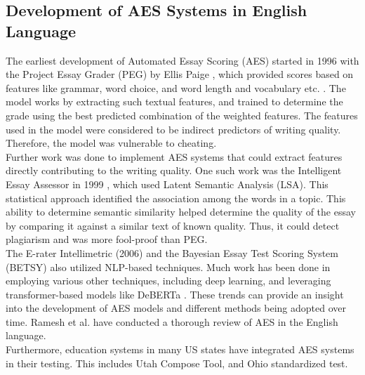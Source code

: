 \documentclass{article}
\begin{document}
\subsection{Development of AES Systems in English Language}
The earliest development of Automated Essay Scoring (AES) started in 1996 with the Project Essay Grader (PEG) by Ellis Paige \cite{page2003peg}, which provided scores based on features like grammar, word choice, and word length and vocabulary etc. . The model works by extracting such textual features, and trained to determine the grade using the best predicted combination of the weighted features. The features used in the model were considered to be indirect predictors of writing quality. Therefore, the model was vulnerable to cheating. \\ Further work was done to implement AES systems that could extract features directly contributing to the writing quality. One such work was the Intelligent Essay Assessor in 1999 \cite{foltz1999essayassessor}, which used Latent Semantic Analysis (LSA). This statistical approach identified the association among the words in a topic. This ability to determine semantic similarity helped determine the quality of the essay by comparing it against a similar text of known quality. Thus, it could detect plagiarism and was more fool-proof than PEG. \\ The E-rater Intellimetric (2006) \cite{rudner2006intellimetric} and the Bayesian Essay Test Scoring System (BETSY) \cite{rudner2002bayes} also utilized NLP-based techniques. Much work has been done in employing various other techniques, including deep learning, and leveraging transformer-based models like DeBERTa \cite{susanto2023deberta}. These trends can provide an insight into the development of AES models and different methods being adopted over time. Ramesh et al. \cite{ramesh2022review} have conducted a thorough review of AES in the English language. \\
Furthermore, education systems in many US states have integrated AES systems in their testing. This includes Utah Compose Tool, and Ohio standardized test. 
\end{document}
